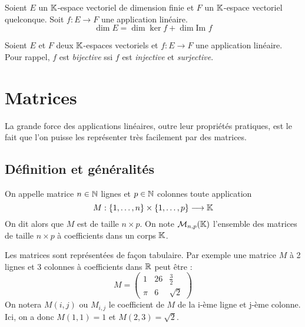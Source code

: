 \begin{theorem}
    Soient $E$ un $\mathbb{K}$-espace vectoriel de dimension finie et $F$ un $\mathbb{K}$-espace vectoriel quelconque. 
    Soit $f : E \longrightarrow F$ une application linéaire. 
        \[ \boxed{\dim E = \dim \ker f + \dim \text{Im } f} \] 
\end{theorem}

\begin{proposition}[Rappel]
    Soient $E$ et $F$ deux $\mathbb{K}$-espaces vectoriels et $f : E \longrightarrow F$ une application 
    linéaire. Pour rappel, $f$ est \emph{bijective} ssi $f$ est \emph{injective} et \emph{surjective}. 
\end{proposition}


\section{Matrices}

La grande force des applications linéaires, outre leur propriétés pratiques, est le fait que l'on puisse 
les représenter très facilement par des matrices. 

\subsection{Définition et généralités}

\begin{definition}[Matrice]
    On appelle matrice $n \in \mathbb{N}$ lignes et $p \in \mathbb{N}$ colonnes toute application 
        \[ M : \{1, \dots , n\} \times \{1, \dots , p\} \longrightarrow \mathbb{K} \] 
    On dit alors que $M$ est de taille $n \times p$.
    On note $ \mathcal{M}_{n,p}(\mathbb{K})$ l'ensemble des matrices de taille $n \times p $ à coefficients dans un corps $\mathbb{K}$.  
\end{definition}

\begin{example}
    Les matrices sont représentées de façon tabulaire. 
    Par exemple une matrice $M$ à 2 lignes et 3 colonnes à coefficients dans $\mathbb{R}$ peut être : 
        \[ M = 
            \begin{pmatrix}
                1 & 26 & \frac{3}{2} \\ 
                \pi & 6 & \sqrt{2} 
            \end{pmatrix} \] 
    On notera $M(i,j)$ ou $M_{i,j}$ le coefficient de $M$ de la i-ème ligne et j-ème colonne. 
    Ici, on a donc $M(1,1) = 1$ et $M(2, 3) = \sqrt{2}$. 
\end{example}

